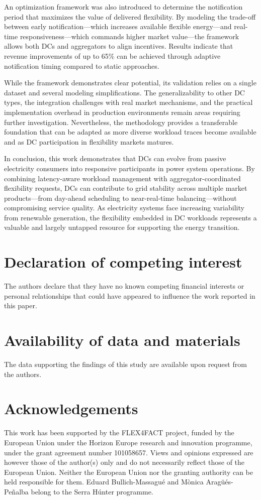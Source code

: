 \documentclass[preprint,12pt]{elsarticle}
\begin{document}
An optimization framework was also introduced to determine the notification period that maximizes the value of delivered flexibility. By modeling the trade-off between early notification—which increases available flexible energy—and real-time responsiveness—which commands higher market value—the framework allows both DCs and aggregators to align incentives. Results indicate that revenue improvements of up to 65\% can be achieved through adaptive notification timing compared to static approaches.

While the framework demonstrates clear potential, its validation relies on a single dataset and several modeling simplifications. The generalizability to other DC types, the integration challenges with real market mechanisms, and the practical implementation overhead in production environments remain areas requiring further investigation. Nevertheless, the methodology provides a transferable foundation that can be adapted as more diverse workload traces become available and as DC participation in flexibility markets matures.

In conclusion, this work demonstrates that DCs can evolve from passive electricity consumers into responsive participants in power system operations. By combining latency-aware workload management with aggregator-coordinated flexibility requests, DCs can contribute to grid stability across multiple market products—from day-ahead scheduling to near-real-time balancing—without compromising service quality. As electricity systems face increasing variability from renewable generation, the flexibility embedded in DC workloads represents a valuable and largely untapped resource for supporting the energy transition.


\section*{Declaration of competing interest}
The authors declare that they have no known competing financial interests or personal relationships that could have appeared to influence the work reported in this paper.

\section*{Availability of data and materials}
The data supporting the findings of this study are available upon request from the authors.

\section*{Acknowledgements}
This work has been supported by the FLEX4FACT project, funded by the European Union under the Horizon Europe research and innovation programme, under the grant agreement number 101058657. Views and opinions expressed are however those of the author(s) only and do not necessarily reflect those of the European Union. Neither the European Union nor the granting authority can be held responsible for them. Eduard Bullich-Massagué and M\`{o}nica Arag\"{u}\'{e}s-Pe\~{n}alba belong to the Serra Húnter programme.
\end{document}
